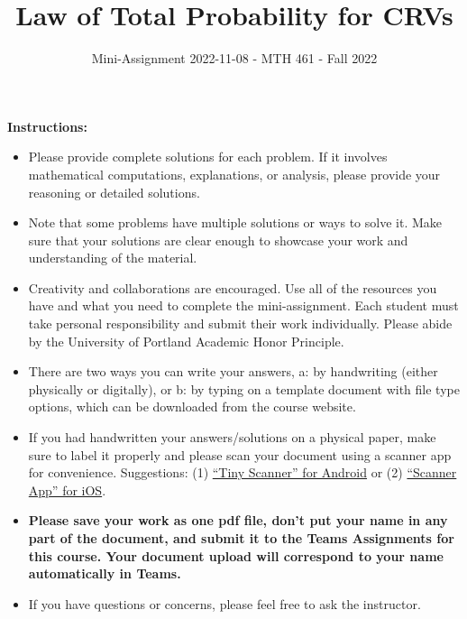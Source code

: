 \documentclass[
]{article}
\title{\textbf{Law of Total Probability for CRVs}}
\subtitle{Mini-Assignment 2022-11-08 - MTH 461 - Fall 2022}
\author{}
\date{\vspace{-2.5em}}
\begin{document}
\maketitle

\hfill\break

\textbf{Instructions:}

\begin{itemize}
\item
  Please provide complete solutions for each problem. If it involves mathematical computations, explanations, or analysis, please provide your reasoning or detailed solutions.
\item
  Note that some problems have multiple solutions or ways to solve it. Make sure that your solutions are clear enough to showcase your work and understanding of the material.
\item
  Creativity and collaborations are encouraged. Use all of the resources you have and what you need to complete the mini-assignment. Each student must take personal responsibility and submit their work individually. Please abide by the University of Portland Academic Honor Principle.
\item
  There are two ways you can write your answers, a: by handwriting (either physically or digitally), or b: by typing on a template document with file type options, which can be downloaded from the course website.
\item
  If you had handwritten your answers/solutions on a physical paper, make sure to label it properly and please scan your document using a scanner app for convenience. Suggestions: (1) \href{https://play.google.com/store/apps/details?id=com.appxy.tinyscanner\&hl=en_US\&gl=US}{``Tiny Scanner'' for Android} or (2) \href{https://apps.apple.com/us/app/scanner-app-scan-pdf-document/id595563753}{``Scanner App'' for iOS}.
\item
  \textbf{Please save your work as one pdf file, don't put your name in any part of the document, and submit it to the Teams Assignments for this course. Your document upload will correspond to your name automatically in Teams.}
\item
  If you have questions or concerns, please feel free to ask the instructor.
\end{itemize}

\newpage
\end{document}
